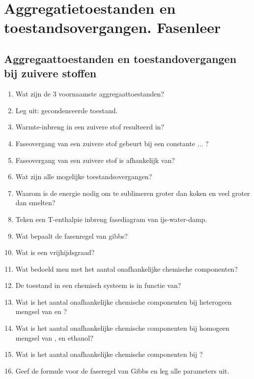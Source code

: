 \documentclass[a4paper,12pt]{article}
\begin{document}
    \maketitle
    
    \section{Aggregatietoestanden en toestandsovergangen. Fasenleer}

    \subsection{Aggregaattoestanden en toestandovergangen bij zuivere stoffen}
    \begin{enumerate}
        \item Wat zijn de 3 voornaamste aggregaattoestanden?
        \item Leg uit: gecondenceerde toestand.
        \item Warmte-inbreng in een zuivere stof resulteerd in?
        \item Faseovergang van een zuivere stof gebeurt bij een constante ... ? 
        \item Faseovergang van een zuivere stof is afhankelijk van?
        \item Wat zijn alle mogelijke toestandsovergangen?
        \item Waarom is de energie nodig om te sublimeren groter dan koken en veel groter dan smelten?
        \item Teken een T-enthalpie inbreng fasediagram van ijs-water-damp.
        \item Wat bepaalt de fasenregel van gibbs?
        \item Wat is een vrijhijdsgraad?
        \item Wat bedoeld men met het aantal onafhankelijke chemische componenten?
        \item De toestand in een chemisch systeem is in functie van?
        \item Wat is het aantal onafhankelijke chemische componenten bij heterogeen mengsel van  en ?
        \item Wat is het aantal onafhankelijke chemische componenten bij homogeen mengsel van , en ethanol?
        \item Wat is het aantal onafhankelijke chemische componenten bij ?
        \item Geef de formule voor de faseregel van Gibbs en leg alle parameters uit.

\end{enumerate}
\end{document}
